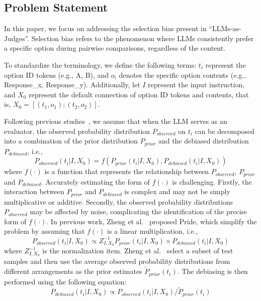 \documentclass[sigconf]{acmart}
\begin{document}
\subsection{Problem Statement }

In this paper, we focus on addressing the selection bias present in ``LLMs-as-Judges''. Selection bias refers to the phenomenon where LLMs consistently prefer a specific option during pairwise comparisons, regardless of the content.

To standardize the terminology, we define the following terms: 
$t_i$ represent the option ID tokens (e.g., A, B), and $o_i$ denotes the specific option contents (e.g., Response\_x, Response\_y). Additionally, let $I$ represent the input instruction, and $X_0$ represent the default connection of option ID tokens and contents, that is, $X_0=[(t_1,o_1);(t_2,o_2)]$.

Following previous studies~\cite{zheng2023large}, we assume that when the LLM serves as an evaluator, the observed probability distribution $P_{observed}$ on $t_i$ can be decomposed into a combination of the prior distribution $P_{prior}$ and the debiased distribution $P_{debiased}$, i.e.,
\begin{equation}\label{eqn-1} 
P_{observed}(t_i|I,X_0) = f(P_{prior}(t_i|I,X_0),P_{debiased}(t_i|I,X_0) ) 
\end{equation}
where $f(\cdot)$ is a function that represents the relationship between $P_{observed}$, $P_{prior}$ and $P_{debiased}$.
Accurately estimating the form of $f(\cdot)$ is challenging. Firstly, the interaction between $P_{prior}$ and $P_{debiased}$ is complex and may not be simply multiplicative or additive.
Secondly, the observed probability distributions $P_{observed}$ may be affected by noise, complicating the identification of the precise form of $f(\cdot)$.
In previous work, Zheng et al.~\cite{zheng2023large} proposed Pride, which simplify the problem by assuming that $f(\cdot)$ is a linear multiplication, i.e.,
\begin{equation}\label{eqn-2} 
P_{observed}(t_i|I,X_0) \propto Z^{-1}_{I,X_0} P_{prior}(t_i|I,X_0) \times P_{debiased}(t_i|I,X_0)
\end{equation}
where $Z^{-1}_{I,X_0}$ is the normalization item. Zheng et al.~\cite{zheng2023large} select a subset of test samples and then use the average observed probability distributions from different arrangements as the prior estimates $\tilde{P}_{prior}(t_i)$.
The debiasing is then performed using the following equation:
\begin{equation}\label{eqn-3} 
 P_{debiased}(t_i|I,X_0) \propto P_{observed}(t_i|I,X_0) / \tilde{P}_{prior}(t_i)
\end{equation}
\end{document}
